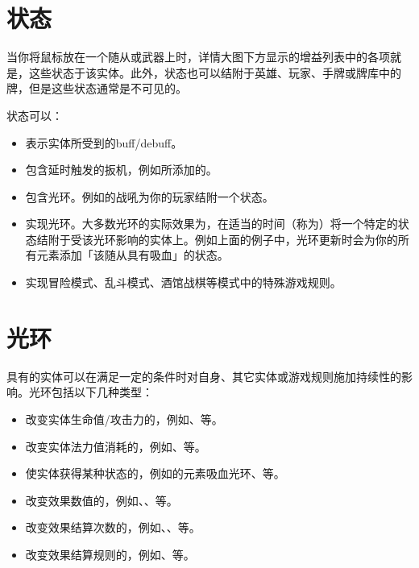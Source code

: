 \section{状态}
\label{enchantment}

当你将鼠标放在一个随从或武器上时，详情大图下方显示的增益列表中的各项就是，这些状态于该实体。此外，状态也可以结附于英雄、玩家、手牌或牌库中的牌，但是这些状态通常是不可见的。

状态可以：
\begin{itemize}
    \item 表示实体所受到的buff/debuff。
    \item 包含延时触发的扳机，例如所添加的。
    \item 包含光环。例如的战吼为你的玩家结附一个状态。
    \item 实现光环。大多数光环的实际效果为，在适当的时间（称为）将一个特定的状态结附于受该光环影响的实体上。例如上面的例子中，光环更新时会为你的所有元素添加「该随从具有吸血」的状态。
    \item 实现冒险模式、乱斗模式、酒馆战棋等模式中的特殊游戏规则。
\end{itemize}

\section{光环}
\label{aura}

具有的实体可以在满足一定的条件时对自身、其它实体或游戏规则施加持续性的影响。光环包括以下几种类型：
\begin{itemize}
    \item 改变实体生命值/攻击力的，例如、等。
    \item 改变实体法力值消耗的，例如、等。
    \item 使实体获得某种状态的，例如的元素吸血光环、等。
    \item 改变效果数值的，例如、、等。
    \item 改变效果结算次数的，例如、、等。
    \item 改变效果结算规则的，例如、等。
\end{itemize}

